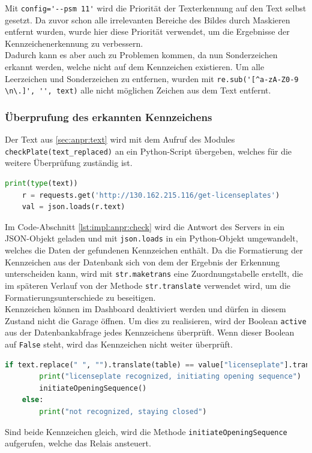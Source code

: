 Mit \verb|config='--psm 11'| wird die Priorität der Texterkennung auf den Text selbst gesetzt. Da zuvor schon alle irrelevanten Bereiche des Bildes durch Maskieren entfernt wurden, wurde hier diese Priorität verwendet, um die Ergebnisse der Kennzeichenerkennung zu verbessern. \cite{PSM11} \\
Dadurch kann es aber auch zu Problemen kommen, da nun Sonderzeichen erkannt werden, welche nicht auf dem Kennzeichen existieren. Um alle Leerzeichen und Sonderzeichen zu entfernen, wurden mit \verb|re.sub('[^a-zA-Z0-9 \n\.]', '', text)| alle nicht möglichen Zeichen aus dem Text entfernt.


\subsubsection{Überprufung des erkannten Kennzeichens}
Der Text aus \ref{sec:anpr:text} wird mit dem Aufruf des Modules \verb|checkPlate(text_replaced)| an ein Python-Script übergeben, welches für die weitere Überprüfung zuständig ist.

\begin{lstlisting}[language=Python, caption=Abfrage der Kennzeichen aus der Datenbank, label=lst:impl:anpr:check:db]
    print(type(text))
    r = requests.get('http://130.162.215.116/get-licenseplates')
    val = json.loads(r.text)
\end{lstlisting}

Im Code-Abschnitt \ref{lst:impl:anpr:check} wird die Antwort des Servers in ein JSON-Objekt geladen und mit \verb|json.loads| in ein Python-Objekt umgewandelt, welches die Daten der gefundenen Kennzeichen enthält. Da die Formatierung der Kennzeichen aus der Datenbank sich von dem der Ergebnis der Erkennung unterscheiden kann, wird mit \verb|str.maketrans| eine Zuordnungstabelle erstellt, die im späteren Verlauf von der Methode \verb|str.translate| verwendet wird, um die Formatierungsunterschiede zu beseitigen.\\
Kennzeichen können im Dashboard deaktiviert werden und dürfen in diesem Zustand nicht die Garage öffnen. Um dies zu realisieren, wird der Boolean \verb|active| aus der Datenbankabfrage jedes Kennzeichens überprüft. Wenn dieser Boolean auf \verb|False| steht, wird das Kennzeichen nicht weiter überprüft.\\

 \begin{lstlisting}[language=Python, caption=Überprüfung auf Gleichheit der beiden Strings, label=lst:impl:anpr:check]
    if text.replace(" ", "").translate(table) == value["licenseplate"].translate(table).replace(" ", ""):
        print("licenseplate recognized, initiating opening sequence")
        initiateOpeningSequence()
    else:
        print("not recognized, staying closed")
 \end{lstlisting}
 Sind beide Kennzeichen gleich, wird die Methode \verb|initiateOpeningSequence| aufgerufen, welche das Relais ansteuert.
